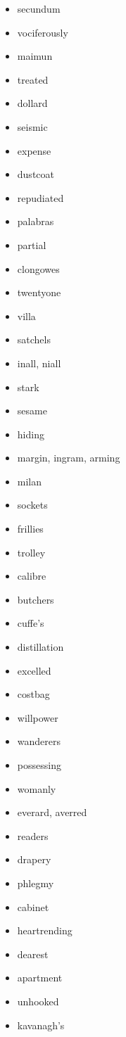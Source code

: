 \documentclass{article}
\begin{document}
\begin{itemize}
    \item secundum
    \item vociferously
    \item maimun
    \item treated
    \item dollard
    \item seismic
    \item expense
    \item dustcoat
    \item repudiated
    \item palabras
    \item partial
    \item clongowes
    \item twentyone
    \item villa
    \item satchels
    \item inall, niall
    \item stark
    \item sesame
    \item hiding
    \item margin, ingram, arming
    \item milan
    \item sockets
    \item frillies
    \item trolley
    \item calibre
    \item butchers
    \item cuffe's
    \item distillation
    \item excelled
    \item costbag
    \item willpower
    \item wanderers
    \item possessing
    \item womanly
    \item everard, averred
    \item readers
    \item drapery
    \item phlegmy
    \item cabinet
    \item heartrending
    \item dearest
    \item apartment
    \item unhooked
    \item kavanagh's

\end{itemize}
\end{document}
